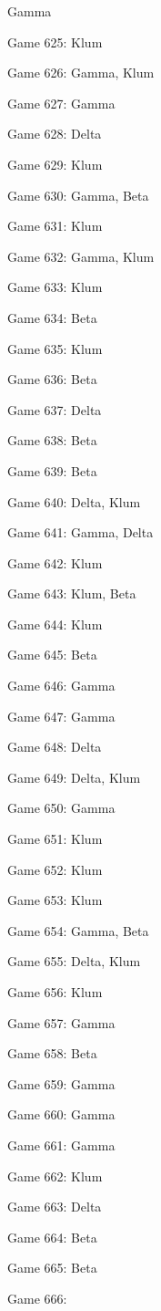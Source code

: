 \documentclass{article}
\begin{document}
\begin{multicols}{3}
\begin{compactitem}
Gamma
\item Game 625:
Klum
\item Game 626:
Gamma, Klum
\item Game 627:
Gamma
\item Game 628:
Delta
\item Game 629:
Klum
\item Game 630:
Gamma, Beta
\item Game 631:
Klum
\item Game 632:
Gamma, Klum
\item Game 633:
Klum
\item Game 634:
Beta
\item Game 635:
Klum
\item Game 636:
Beta
\item Game 637:
Delta
\item Game 638:
Beta
\item Game 639:
Beta
\item Game 640:
Delta, Klum
\item Game 641:
Gamma, Delta
\item Game 642:
Klum
\item Game 643:
Klum, Beta
\item Game 644:
Klum
\item Game 645:
Beta
\item Game 646:
Gamma
\item Game 647:
Gamma
\item Game 648:
Delta
\item Game 649:
Delta, Klum
\item Game 650:
Gamma
\item Game 651:
Klum
\item Game 652:
Klum
\item Game 653:
Klum
\item Game 654:
Gamma, Beta
\item Game 655:
Delta, Klum
\item Game 656:
Klum
\item Game 657:
Gamma
\item Game 658:
Beta
\item Game 659:
Gamma
\item Game 660:
Gamma
\item Game 661:
Gamma
\item Game 662:
Klum
\item Game 663:
Delta
\item Game 664:
Beta
\item Game 665:
Beta
\item Game 666:

\end{compactitem}
\end{multicols}
\end{document}
